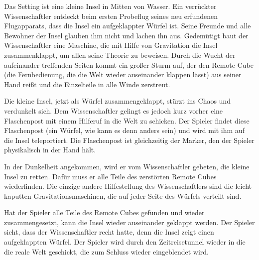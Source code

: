 
Das Setting ist eine kleine Insel in Mitten von Wasser. Ein verrückter Wissenschaftler entdeckt beim ersten Probeflug seines neu erfundenen Flugapparats, dass die Insel ein aufgeklappter Würfel ist. Seine Freunde und alle Bewohner der Insel glauben ihm nicht und lachen ihn aus. Gedemütigt baut der Wissenschaftler eine Maschine, die mit Hilfe von Gravitation die Insel zusammenklappt, um allen seine Theorie zu beweisen. Durch die Wucht der aufeinander treffenden Seiten kommt ein großer Sturm auf, der den Remote Cube (die Fernbedienung, die die Welt wieder auseinander klappen lässt) aus seiner Hand reißt und die Einzelteile in alle Winde zerstreut.

Die kleine Insel, jetzt als Würfel zusammengeklappt, stürzt ins Chaos und verdunkelt sich. Dem Wissenschaftler gelingt es jedoch kurz vorher eine Flaschenpost mit einem Hilferuf in die Welt zu schicken. Der Spieler findet diese Flaschenpost (ein Würfel, wie kann es denn anders sein) und wird mit ihm auf die Insel teleportiert. Die Flaschenpost ist gleichzeitig der Marker, den der Spieler physikalisch in der Hand hält. 

In der Dunkelheit angekommen, wird er vom Wissenschaftler gebeten, die kleine Insel zu retten. Dafür muss er alle Teile des zerstörten Remote Cubes wiederfinden. Die einzige andere Hilfestellung des Wissenschaftlers sind die leicht kaputten Gravitationsmaschinen, die auf jeder Seite des Würfels verteilt sind.

Hat der Spieler alle Teile des Remote Cubes gefunden und wieder zusammengesetzt, kann die Insel wieder auseinander geklappt werden. Der Spieler sieht, dass der Wissenschaftler recht hatte, denn die Insel zeigt einen aufgeklappten Würfel. Der Spieler wird durch den Zeitreisetunnel wieder in die die reale Welt geschickt, die zum Schluss wieder eingeblendet wird.